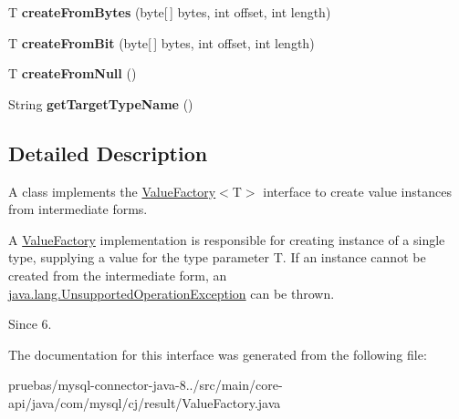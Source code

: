 \begin{DoxyCompactItemize}
T {\bfseries create\+From\+Bytes} (byte\mbox{[}$\,$\mbox{]} bytes, int offset, int length)
\item 
\mbox{\label{interfacecom_1_1mysql_1_1cj_1_1result_1_1_value_factory_a23ac617a66fbf713243dd67ab04d30e6}} 
T {\bfseries create\+From\+Bit} (byte\mbox{[}$\,$\mbox{]} bytes, int offset, int length)
\item 
\mbox{\label{interfacecom_1_1mysql_1_1cj_1_1result_1_1_value_factory_a56a65ddc42f449859a1dedb6395016cf}} 
T {\bfseries create\+From\+Null} ()
\item 
\mbox{\label{interfacecom_1_1mysql_1_1cj_1_1result_1_1_value_factory_a54de50a710778bcff410434107d34036}} 
String {\bfseries get\+Target\+Type\+Name} ()
\end{DoxyCompactItemize}


\subsection{Detailed Description}
A class implements the {\ttfamily \mbox{\hyperlink{interfacecom_1_1mysql_1_1cj_1_1result_1_1_value_factory}{Value\+Factory}}$<$T$>$} interface to create value instances from intermediate forms. 

A {\ttfamily \mbox{\hyperlink{interfacecom_1_1mysql_1_1cj_1_1result_1_1_value_factory}{Value\+Factory}}} implementation is responsible for creating instance of a single type, supplying a value for the type parameter {\ttfamily T}. If an instance cannot be created from the intermediate form, an \mbox{\hyperlink{}{java.\+lang.\+Unsupported\+Operation\+Exception}} can be thrown.

\begin{DoxySince}{Since}
6. 
\end{DoxySince}


The documentation for this interface was generated from the following file\+:\begin{DoxyCompactItemize}
\item 
pruebas/mysql-\/connector-\/java-\/8../src/main/core-\/api/java/com/mysql/cj/result/Value\+Factory.\+java\end{DoxyCompactItemize}
